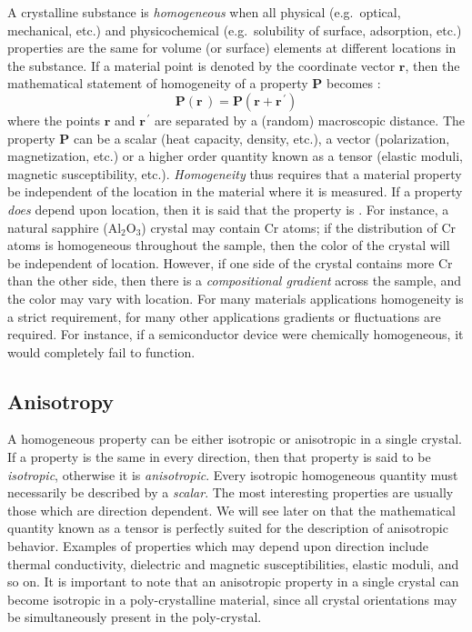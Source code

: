 A crystalline substance is \textit{homogeneous} when all physical (e.g.\ optical, mechanical, etc.)  and physicochemical (e.g.\ solubility of surface, adsorption, etc.)  properties are the same for volume (or surface) elements at different locations in the substance.  If a material point is denoted by the coordinate vector $\mathbf{r}$, then the mathematical statement of homogeneity of a property $\mathbf{P}$ becomes :
\begin{equation}
	\mathbf{P}(\mathbf{r}\,)=\mathbf{P}(\mathbf{r}+\mathbf{r}^{\,\prime})
\end{equation}
where the points $\mathbf{r}$ and $\mathbf{r}^{\,\prime}$ are separated by a (random) macroscopic distance.  The property $\mathbf{P}$ can be a scalar (heat capacity, density, etc.), a vector (polarization, magnetization, etc.)  or a higher order quantity known as a tensor (elastic moduli, magnetic susceptibility, etc.). \textit{Homogeneity} thus requires that a material property be independent of the location in the material where it is measured.  If a property \textit{does} depend upon location, then it is said that the property is .  For instance, a natural sapphire (Al$_2$O$_3$) crystal may contain Cr atoms; if the distribution of Cr atoms is homogeneous throughout the sample, then the color of the crystal will be independent of location.  However, if one side of the crystal contains more Cr than the other side, then there is a \textit{compositional gradient} across the sample, and the color may vary with location.  For many materials applications homogeneity is a strict requirement, for many other applications gradients or fluctuations are required.  For instance, if a semiconductor device were chemically homogeneous, it would completely fail to function.

\subsection{Anisotropy}

A homogeneous property can be either isotropic or anisotropic in a single crystal.  If a property is the same in every direction, then that property is said to be \textit{isotropic}, otherwise it is \textit{anisotropic}.  Every isotropic homogeneous quantity must necessarily be described by a \textit{scalar}.  The most interesting properties are usually those which are direction dependent.  We will see later on that the mathematical quantity known as a tensor is perfectly suited for the description of anisotropic behavior.  Examples of properties which may depend upon direction include thermal conductivity, dielectric and magnetic susceptibilities, elastic moduli, and so on.  It is important to note that an anisotropic property in a single crystal can become isotropic in a poly-crystalline material, since all crystal orientations may be simultaneously present in the poly-crystal.

